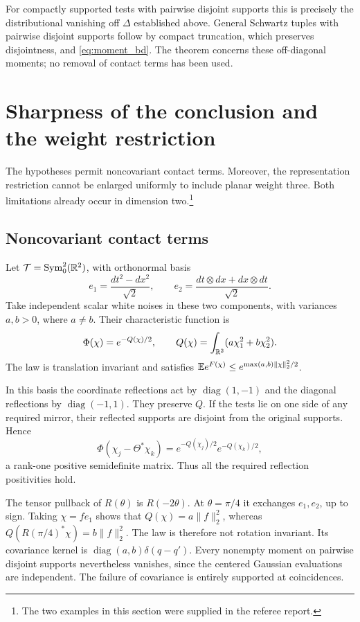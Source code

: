 For compactly supported tests with pairwise disjoint supports this
is precisely the distributional vanishing off $\Delta$ established
above. General Schwartz tuples with pairwise disjoint supports
follow by compact truncation, which preserves disjointness, and
\eqref{eq:moment_bd}. The theorem concerns these
off-diagonal moments; no removal of contact terms has been used.


\section{Sharpness of the conclusion and the weight restriction}
\label{sec:sharpness-examples}
\enlargethispage{2pt}

The hypotheses permit noncovariant contact terms. Moreover, the
representation restriction cannot be enlarged uniformly to include
planar weight three. Both limitations already occur in dimension two.\footnote{The two
examples in this section were supplied in the referee report.}

\subsection{Noncovariant contact terms}

Let $\mathcal{T}=\operatorname{Sym}^2_0(\mathbb{R}^2)$, with orthonormal basis
\[
 e_1=\frac{dt^2-dx^2}{\sqrt2},\qquad
 e_2=\frac{dt\otimes dx+dx\otimes dt}{\sqrt2}.
\]
Take independent scalar white noises in these two components, with
variances $a,b>0$, where $a\ne b$. Their characteristic function is
\[
 \Phi(\chi)=e^{-Q(\chi)/2},\qquad
 Q(\chi)=\int_{\mathbb{R}^2}(a\chi_1^2+b\chi_2^2).
\]
The law is translation invariant and satisfies
$\mathbb{E} e^{F(\chi)}\leq e^{\max(a,b)\|\chi\|_2^2/2}$.

In this basis the coordinate reflections act by
$\operatorname{diag}(1,-1)$ and the diagonal reflections by
$\operatorname{diag}(-1,1)$. They preserve $Q$. If the tests lie on
one side of any required mirror, their reflected supports are disjoint
from the original supports. Hence
\[
 \Phi(\chi_j-\Theta^*\chi_k)
 =e^{-Q(\chi_j)/2}e^{-Q(\chi_k)/2},
\]
a rank-one positive semidefinite matrix. Thus all the required
reflection positivities hold.

The tensor pullback of $R(\theta)$ is $R(-2\theta)$. At
$\theta=\pi/4$ it exchanges $e_1,e_2$, up to sign. Taking
$\chi=f e_1$ shows that $Q(\chi)=a\|f\|_2^2$, whereas
$Q(R(\pi/4)^*\chi)=b\|f\|_2^2$. The law is therefore not rotation
invariant. Its covariance kernel is
$\operatorname{diag}(a,b)\delta(q-q')$.
Every nonempty moment on pairwise disjoint supports nevertheless
vanishes, since the centered Gaussian evaluations are independent.
The failure of covariance is entirely supported at coincidences.

